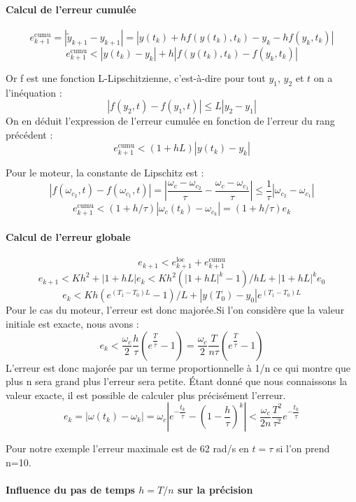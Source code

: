 \documentclass[10pt]{article}
\begin{document}
\paragraph{Calcul de l’erreur cumulée}

$$e_{k+1}^{\text{cumu}}=|\tilde{y}_{k+1}-y_{k+1} |=|y(t_k )+hf(y(t_k ),t_k )-y_k-hf(y_k,t_k ) |$$
$$e_{k+1}^{\text{cumu}}<|y(t_k )-y_k |+h|f(y(t_k ),t_k )-f(y_k,t_k ) |$$

Or f est une fonction L-Lipschitzienne, c’est-à-dire pour tout $y_1$, $y_2$ et $t$ on a l’inéquation :
$$|f(y_2,t)-f(y_1,t) |\leq L|y_2-y_1 |$$
On en déduit l’expression de l’erreur cumulée en fonction de l’erreur du rang précédent :
$$e_{k+1}^{\text{cumu}}<(1+hL)|y(t_k )-y_k |$$


Pour le moteur, la constante de Lipschitz est :
$$
|f(\omega_{c_2},t)-f(\omega_{c_1},t) |
= \left|\dfrac{\omega_c-\omega_{c_2}}{\tau}-\dfrac{\omega_c-\omega_{c_1}}{\tau}\right|
\leq \dfrac{1}{\tau} |\omega_{c_2}-\omega_{c_1} |
$$
$$e_{k+1}^{\text{cumu}}<(1+h/\tau)|\omega_c(t_k )-\omega_{c_k} |=(1+h/\tau) e_k$$

\paragraph{Calcul de l’erreur globale}
$$e_{k+1}<e_{k+1}^{\text{loc}}+e_{k+1}^{\text{cumu}}$$
$$e_{k+1}<Kh^2+|1+hL| e_k<Kh^2  (|1+hL|^k-1)/hL+|1+hL|^k e_0$$
$$e_k<Kh (e^{(T_1-T_0 )L}-1)/L+|y(T_0 )-y_0 | e^{(T_1-T_0 )L}$$
Pour le cas du moteur, l’erreur est donc majorée.Si l’on considère que la valeur initiale est exacte, nous avons :
$$e_k<\dfrac{\omega_c}{2}  \dfrac{h}{\tau} \left(e^{\dfrac{T}{\tau}}-1\right)= \dfrac{\omega_c}{2}  \dfrac{T}{n\tau} \left(e^{\dfrac{T}{\tau}}-1\right)$$
L’erreur est donc majorée par un terme proportionnelle à 1/n ce qui montre que plus n sera grand plus l’erreur sera petite. Étant donné que nous connaissons la valeur exacte, il est possible de calculer plus précisément l’erreur.
$$e_k=\left|\omega(t_k)-\omega_k \right|=\omega_c\left|e^{-\dfrac{t_k}{\tau}}-\left(1-\dfrac{h}{\tau}\right)^k \right|<\dfrac{\omega_c}{2n}  \dfrac{T^2}{\tau^2}  e^{-\dfrac{t_k}{\tau}}$$

Pour notre exemple l’erreur maximale est de 62 rad/s en $t=\tau$ si l’on prend n=10.
\paragraph{Influence du pas de temps $h=T/n$ sur la précision}
\end{document}
